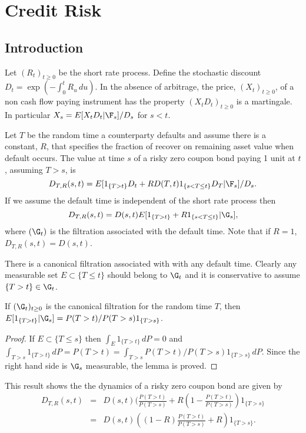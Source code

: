 \chapter{Credit Risk}

\section{Introduction}
Let $(R_t)_{t\ge0}$ be the short rate process. Define the stochastic
discount $D_t = \exp(-\int_0^t R_u\,du)$. In the absence of arbitrage,
the price, $(X_t)_{t\ge0}$, of a non cash flow paying instrument has
the property $(X_t D_t)_{t\ge0}$ is a martingale. In particular $X_s =
E[X_t D_t|\F_s]/D_s$ for $s < t$.

Let $T$ be the random time a counterparty defaults and assume there
is a constant, $R$, that specifies the fraction of recover on remaining
asset value when default occurs. The value at time $s$ of a risky zero coupon
bond paying 1 unit at $t$, assuming $T > s$, is
\begin{equation*}
D_{T,R}(s, t) = E[1_{\{T>t\}} D_t + RD(T, t)1_{\{s < T\le t\}} D_T|\F_s]/D_s.
\end{equation*}
If we assume the default time is independent of the short rate process then
\begin{equation*}
D_{T,R}(s, t) = D(s, t)E[1_{\{T>t\}} + R1_{\{s < T\le t\}}|\G_s],
\end{equation*}
where
$(\G_t)$ is the filtration associated with the default time. Note
that if $R = 1$,
$D_{T,R}(s, t) = D(s, t)$.

There is a canonical filtration associated with with any default time.
Clearly any measurable set $E\subset\{T\le t\}$ should belong to $\G_t$
and it is conservative to assume $\{T > t\}\in\G_t$.

\begin{lemma}
If $(\G_t)_{t\ge0}$ is the canonical filtration for the random time $T$,
then $E[1_{\{T > t\}}|\G_s] = P(T > t)/P(T > s) 1_{\{T > s\}}$.
\end{lemma}
\begin{proof}
If $E\subset\{T \le s\}$
then $\int_E 1_{\{T > t\}}\,dP = 0$ and
$\int_{T > s} 1_{\{T > t\}}\,dP = P(T > t) 
= \int_{T > s} P(T > t)/P(T > s) 1_{\{T > s\}}\,dP$.
Since the right hand side is $\G_s$ measurable, the lemma is proved.
\end{proof}

This result shows the the dynamics of a risky zero coupon bond are
given by 
\begin{eqnarray*}
D_{T,R}(s, t) &=& D(s,t)(\frac{P(T>t)}{P(T>s)} + R(1 - \frac{P(T>t)}{P(T>s)})1_{\{T > s\}}\\
	&=& D(s,t)((1 - R)\frac{P(T>t)}{P(T>s)} + R)1_{\{T > s\}}.
\end{eqnarray*}
